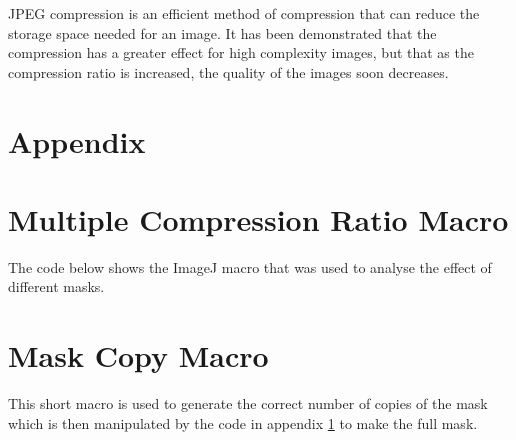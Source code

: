 	JPEG compression is an efficient method of compression that can reduce the storage space needed for an image. It has been demonstrated that the compression has a greater effect for high complexity images, but that as the compression ratio is increased, the quality of the images soon decreases.

\section*{Appendix}
	\appendix


	\section{Multiple Compression Ratio Macro}
		\label{app:macro}
		The code below shows the ImageJ macro that was used to analyse the effect of different masks.
		\scriptsize

	\section{Mask Copy Macro}
		\label{app:macro2}
		This short macro is used to generate the correct number of copies of the mask which is then manipulated by the code in appendix \ref{app:macro} to make the full mask.
		\scriptsize

